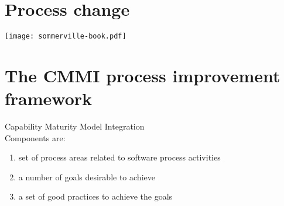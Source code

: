\documentclass[a4paper,11pt,twocolumn]{report}
\begin{document}
    \section{Process change}
    \texttt{[image: sommerville-book.pdf]}
    \section{The CMMI process improvement framework}
    Capability Maturity Model Integration\\
    Components are:
    \begin{enumerate}
        \item set of process areas related to software process activities
        \item a number of goals  desirable to achieve
        \item a set of good practices to achieve the goals
    \end{enumerate}
\end{document}
